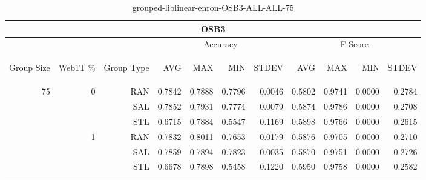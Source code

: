 \begin{center}
\begin{table}[htbp] 
 \begin{center}
\begin{tabular}{ | r | r | r | r | r | r | r | r | r | r | r |}
\hline
\multicolumn{11}{|c|}{OSB3}\\
\hline
 & & & \multicolumn{4}{|c|}{Accuracy} & \multicolumn{4}{|c|}{F-Score}\\ \cline{4-11}
\begin{sideways}Group Size\end{sideways} & \begin{sideways}Web1T \%\end{sideways} & \begin{sideways}Group Type\end{sideways} & \begin{sideways}AVG\end{sideways} & \begin{sideways}MAX\end{sideways} & \begin{sideways}MIN\end{sideways} & \begin{sideways}STDEV\end{sideways} & \begin{sideways}AVG\end{sideways} & \begin{sideways}MAX\end{sideways} & \begin{sideways}MIN\end{sideways} & \begin{sideways}STDEV\end{sideways}\\
\hline
\multirow{6}{*}{75}
 & \multirow{3}{*}{0} & RAN & 0.7842 & 0.7888 & 0.7796 & 0.0046 & 0.5802 & 0.9741 & 0.0000 & 0.2784\\ \cline{3-11}
 &   & SAL & 0.7852 & 0.7931 & 0.7774 & 0.0079 & 0.5874 & 0.9786 & 0.0000 & 0.2708\\ \cline{3-11}
 &   & STL & 0.6715 & 0.7884 & 0.5547 & 0.1169 & 0.5898 & 0.9766 & 0.0000 & 0.2615\\ \cline{2-11}
 & \multirow{3}{*}{1} & RAN & 0.7832 & 0.8011 & 0.7653 & 0.0179 & 0.5876 & 0.9705 & 0.0000 & 0.2710\\ \cline{3-11}
 &   & SAL & 0.7859 & 0.7894 & 0.7823 & 0.0035 & 0.5870 & 0.9751 & 0.0000 & 0.2726\\ \cline{3-11}
 &   & STL & 0.6678 & 0.7898 & 0.5458 & 0.1220 & 0.5950 & 0.9758 & 0.0000 & 0.2582\\ \cline{2-11}
\hline
\end{tabular}
\caption{grouped-liblinear-enron-OSB3-ALL-ALL-75}
\end{center}
 \end{table}
\end{center}

